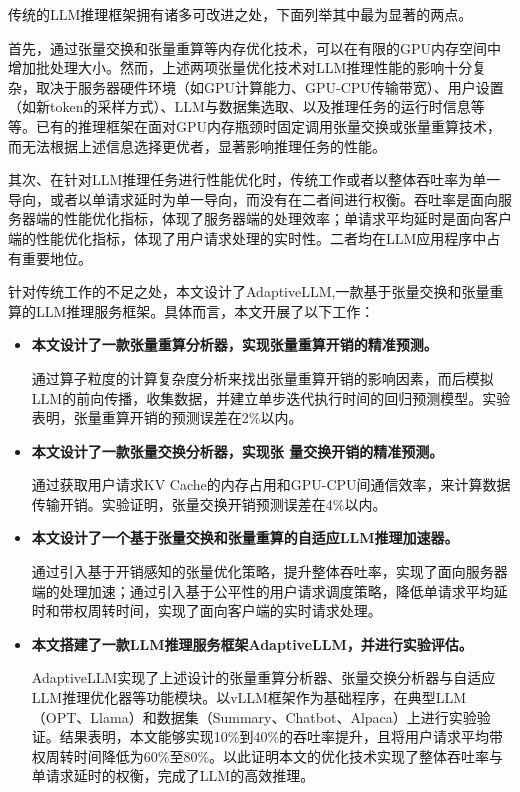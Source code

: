 传统的LLM推理框架拥有诸多可改进之处，下面列举其中最为显著的两点。 \par

首先，通过张量交换和张量重算等内存优化技术，可以在有限的GPU内存空间中增加批处理大小。然而，上述两项张量优化技术对LLM推理性能的影响十分复杂，取决于服务器硬件环境（如GPU计算能力、GPU-CPU传输带宽）、用户设置（如新token的采样方式）、LLM与数据集选取、以及推理任务的运行时信息等等。已有的推理框架\cite{Swapping, vLLM, ORCA}在面对GPU内存瓶颈时固定调用张量交换或张量重算技术，而无法根据上述信息选择更优者，显著影响推理任务的性能。 \par

其次、在针对LLM推理任务进行性能优化时，传统工作\cite{Swapping, vLLM, SpecInfer}或者以整体吞吐率为单一导向，或者以单请求延时为单一导向，而没有在二者间进行权衡。吞吐率是面向服务器端的性能优化指标，体现了服务器端的处理效率；单请求平均延时是面向客户端的性能优化指标，体现了用户请求处理的实时性。二者均在LLM应用程序中占有重要地位。\par

针对传统工作的不足之处，本文设计了AdaptiveLLM,一款基于张量交换和张量重算的LLM推理服务框架。具体而言，本文开展了以下工作：

\begin{itemize} 
    \item { \textbf{本文设计了一款张量重算分析器，实现张量重算开销的精准预测。} 
    \setlength{\parindent}{2em} \par
    通过算子粒度的计算复杂度分析来找出张量重算开销的影响因素，而后模拟LLM的前向传播，收集数据，并建立单步迭代执行时间的回归预测模型。实验表明，张量重算开销的预测误差在2\%以内。}
    \item \textbf{本文设计了一款张量交换分析器，实现张 量交换开销的精准预测。}
    \setlength{\parindent}{2em} \par
    通过获取用户请求KV Cache的内存占用和GPU-CPU间通信效率，来计算数据传输开销。实验证明，张量交换开销预测误差在4\%以内。  
    \item \textbf{本文设计了一个基于张量交换和张量重算的自适应LLM推理加速器。}
    \setlength{\parindent}{2em} \par
    通过引入基于开销感知的张量优化策略，提升整体吞吐率，实现了面向服务器端的处理加速；通过引入基于公平性的用户请求调度策略，降低单请求平均延时和带权周转时间，实现了面向客户端的实时请求处理。
    \item \textbf{本文搭建了一款LLM推理服务框架AdaptiveLLM，并进行实验评估。}
    \setlength{\parindent}{2em} \par
    AdaptiveLLM实现了上述设计的张量重算分析器、张量交换分析器与自适应LLM推理优化器等功能模块。以vLLM框架作为基础程序，在典型LLM（OPT\cite{OPT}、Llama\cite{Llama}）和数据集（Summary\cite{Summary}、Chatbot\cite{Chatbot}、Alpaca\cite{Alpaca}）上进行实验验证。结果表明，本文能够实现10\%到40\%的吞吐率提升，且将用户请求平均带权周转时间降低为60\%至80\%。以此证明本文的优化技术实现了整体吞吐率与单请求延时的权衡，完成了LLM的高效推理。
\end{itemize}